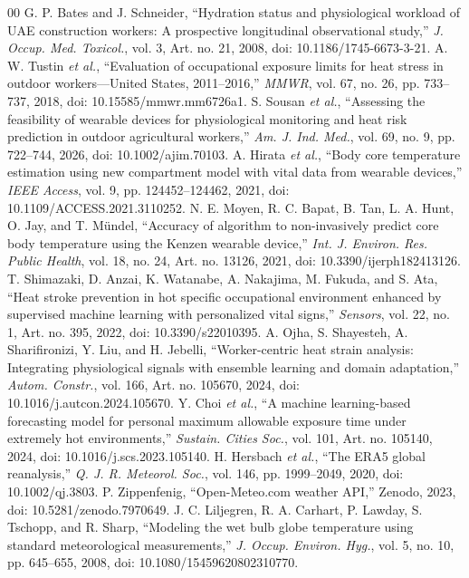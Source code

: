 \documentclass[conference,a4paper]{IEEEtran}
\begin{document}
\begin{thebibliography}{00}
 G. P. Bates and J. Schneider, ``Hydration status and physiological workload of UAE construction workers: A prospective longitudinal observational study,'' \emph{J. Occup. Med. Toxicol.}, vol. 3, Art. no. 21, 2008, doi: 10.1186/1745-6673-3-21.
 A. W. Tustin \emph{et al.}, ``Evaluation of occupational exposure limits for heat stress in outdoor workers---United States, 2011--2016,'' \emph{MMWR}, vol. 67, no. 26, pp. 733--737, 2018, doi: 10.15585/mmwr.mm6726a1.
 S. Sousan \emph{et al.}, ``Assessing the feasibility of wearable devices for physiological monitoring and heat risk prediction in outdoor agricultural workers,'' \emph{Am. J. Ind. Med.}, vol. 69, no. 9, pp. 722--744, 2026, doi: 10.1002/ajim.70103.
 A. Hirata \emph{et al.}, ``Body core temperature estimation using new compartment model with vital data from wearable devices,'' \emph{IEEE Access}, vol. 9, pp. 124452--124462, 2021, doi: 10.1109/ACCESS.2021.3110252.
 N. E. Moyen, R. C. Bapat, B. Tan, L. A. Hunt, O. Jay, and T. M{\"u}ndel, ``Accuracy of algorithm to non-invasively predict core body temperature using the Kenzen wearable device,'' \emph{Int. J. Environ. Res. Public Health}, vol. 18, no. 24, Art. no. 13126, 2021, doi: 10.3390/ijerph182413126.
 T. Shimazaki, D. Anzai, K. Watanabe, A. Nakajima, M. Fukuda, and S. Ata, ``Heat stroke prevention in hot specific occupational environment enhanced by supervised machine learning with personalized vital signs,'' \emph{Sensors}, vol. 22, no. 1, Art. no. 395, 2022, doi: 10.3390/s22010395.
 A. Ojha, S. Shayesteh, A. Sharifironizi, Y. Liu, and H. Jebelli, ``Worker-centric heat strain analysis: Integrating physiological signals with ensemble learning and domain adaptation,'' \emph{Autom. Constr.}, vol. 166, Art. no. 105670, 2024, doi: 10.1016/j.autcon.2024.105670.
 Y. Choi \emph{et al.}, ``A machine learning-based forecasting model for personal maximum allowable exposure time under extremely hot environments,'' \emph{Sustain. Cities Soc.}, vol. 101, Art. no. 105140, 2024, doi: 10.1016/j.scs.2023.105140.
 H. Hersbach \emph{et al.}, ``The ERA5 global reanalysis,'' \emph{Q. J. R. Meteorol. Soc.}, vol. 146, pp. 1999--2049, 2020, doi: 10.1002/qj.3803.
 P. Zippenfenig, ``Open-Meteo.com weather API,'' Zenodo, 2023, doi: 10.5281/zenodo.7970649.
 J. C. Liljegren, R. A. Carhart, P. Lawday, S. Tschopp, and R. Sharp, ``Modeling the wet bulb globe temperature using standard meteorological measurements,'' \emph{J. Occup. Environ. Hyg.}, vol. 5, no. 10, pp. 645--655, 2008, doi: 10.1080/15459620802310770.

\end{thebibliography}
\end{document}
